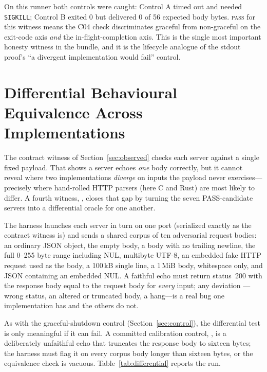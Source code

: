 \documentclass[11pt,letterpaper]{article}
\begin{document}
On this runner both controls were caught: Control A timed out and needed
\texttt{SIGKILL}; Control B exited 0 but delivered 0 of 56 expected body
bytes. \textsc{pass} for this witness means the C04 check discriminates
graceful from non-graceful on the exit-code axis \emph{and} the
in-flight-completion axis. This is the single most important honesty
witness in the bundle, and it is the lifecycle analogue of the stdout
proof's ``a divergent implementation would fail'' control.

\section{Differential Behavioural Equivalence Across Implementations}
\label{sec:differential}

The contract witness of Section~\ref{sec:observed} checks each server against a
single fixed payload. That shows a server echoes \emph{one} body correctly, but it
cannot reveal where two implementations \emph{diverge} on inputs the payload never
exercises---precisely where hand-rolled HTTP parsers (here C and Rust) are most
likely to differ. A fourth witness, , closes that gap
by turning the seven PASS-candidate servers into a differential oracle for one
another.

The harness launches each server in turn on one port (serialized exactly as the
contract witness is) and sends a shared corpus of ten adversarial request bodies:
an ordinary JSON object, the empty body, a body with no trailing newline, the full
0--255 byte range including NUL, multibyte UTF-8, an embedded fake HTTP request
used as the body, a 100\,kB single line, a 1\,MiB body, whitespace only, and JSON
containing an embedded NUL. A faithful echo must return status~200 with the
response body equal to the request body for \emph{every} input; any deviation
---wrong status, an altered or truncated body, a hang---is a real bug one
implementation has and the others do not.

As with the graceful-shutdown control (Section~\ref{sec:control}), the differential
test is only meaningful if it can fail. A committed calibration control,
, is a deliberately unfaithful echo that
truncates the response body to sixteen bytes; the harness must flag it on every
corpus body longer than sixteen bytes, or the equivalence check is vacuous.
Table~\ref{tab:differential} reports the run.
\end{document}

